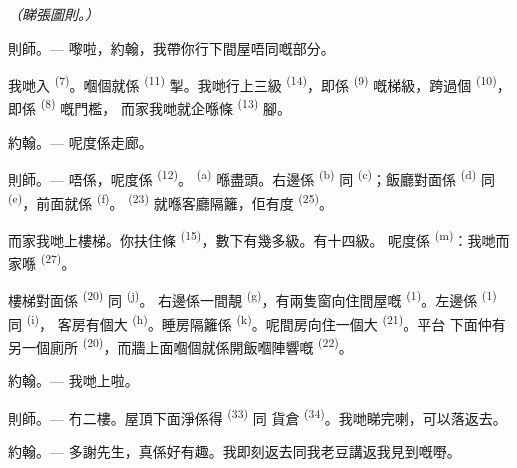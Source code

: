 {\centering\textit{（睇張圖則。）}\par}
\VUsaut{2.4mm}

\textsc{則師}。--- 嚟啦，約翰，我帶你行下間屋唔同嘅部分。

我哋入 \textsuperscript{(7)}。嗰個就係 \textsuperscript{(11)}
掣。我哋行上三級 \textsuperscript{(14)}，即係
\textsuperscript{(9)} 嘅梯級，跨過個 \textsuperscript{(10)}，即係
 \textsuperscript{(8)} 嘅門檻，
而家我哋就企喺條 \textsuperscript{(13)} 腳。

\textsc{約翰}。--- 呢度係走廊。

\textsc{則師}。--- 唔係，呢度係 \textsuperscript{(12)}。
\textsuperscript{(a)} 喺盡頭。右邊係 \textsuperscript{(b)} 同
 \textsuperscript{(c)}；飯廳對面係 \textsuperscript{(d)}
同 \textsuperscript{(e)}，前面就係 \textsuperscript{(f)}。
 \textsuperscript{(23)} 就喺客廳隔籬，佢有度
\textsuperscript{(25)}。

而家我哋上樓梯。你扶住條 \textsuperscript{(15)}，數下有幾多級。有十四級。
呢度係 \textsuperscript{(m)}：我哋而家喺 \textsuperscript{(27)}。

\VUsaut{3.0mm}
\VUsaut{3.0mm}

樓梯對面係 \textsuperscript{(20)} 同 \textsuperscript{(j)}。
右邊係一間靚 \textsuperscript{(g)}，有兩隻窗向住間屋嘅
\textsuperscript{(1)}。左邊係 \textsuperscript{(1)} 同 \textsuperscript{(i)}，
客房有個大 \textsuperscript{(h)}。睡房隔籬係
\textsuperscript{(k)}。呢間房向住一個大 \textsuperscript{(21)}。平台
下面仲有另一個廁所 \textsuperscript{(20)}，而牆上面嗰個就係開飯嗰陣響嘅
\textsuperscript{(22)}。

\textsc{約翰}。--- 我哋上啦。

\textsc{則師}。--- 冇二樓。屋頂下面淨係得 \textsuperscript{(33)} 同
貨倉 \textsuperscript{(34)}。我哋睇完喇，可以落返去。

\textsc{約翰}。--- 多謝先生，真係好有趣。我即刻返去同我老豆講返我見到嘅嘢。
\VUsaut{4.0mm}
\VUfilet{22mm}

